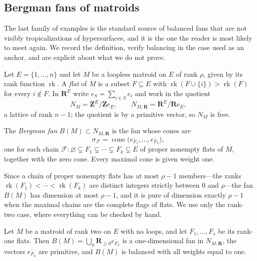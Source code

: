 \subsection{Bergman fans of matroids}
\label{sec:ch10-bergman}

The last family of examples is the standard source of balanced fans that are
not visibly tropicalizations of hypersurfaces, and it is the one the reader
is most likely to meet again.  We record the definition, verify balancing in
the case used as an anchor, and are explicit about what we do not prove.

Let $E=\{1,\ldots,n\}$ and let $M$ be a loopless matroid on $E$ of rank $\rho$, given
by its rank function $\operatorname{rk}$.  A \emph{flat} of $M$ is a subset
$F\subseteq E$ with $\operatorname{rk}(F\cup\{i\})>\operatorname{rk}(F)$ for
every $i\notin F$.  In $\mathbf R^E$ write $e_S=\sum_{i\in S}e_i$ and work in
the quotient
\[
 N_M=\mathbf Z^E/\mathbf Ze_E,
 \qquad
 N_{M,\mathbf R}=\mathbf R^E/\mathbf Re_E,
\]
a lattice of rank $n-1$; the quotient is by a primitive vector, so $N_M$ is
free.

\begin{definition}
\label{def:ch10-bergman-fan}
The \emph{Bergman fan} $B(M)\subset N_{M,\mathbf R}$ is the fan whose cones
are
\[
 \sigma_{\mathscr F}
 =\operatorname{cone}
   \bigl(\overline{e_{F_1}},\ldots,\overline{e_{F_k}}\bigr),
\]
one for each chain $\mathscr F:\varnothing\subsetneq F_1\subsetneq\cdots
\subsetneq F_k\subsetneq E$ of proper nonempty flats of $M$, together with
the zero cone.  Every maximal cone is given weight one.
\end{definition}

Since a chain of proper nonempty flats has at most $\rho-1$ members---the
ranks $\operatorname{rk}(F_1)<\cdots<\operatorname{rk}(F_k)$ are distinct
integers strictly between $0$ and $\rho$---the fan $B(M)$ has dimension at
most $\rho-1$, and it is pure of dimension exactly $\rho-1$ when the maximal
chains are the complete flags of flats.  We use only the rank-two case,
where everything can be checked by hand.

\begin{proposition}
\label{prop:ch10-bergman-rank-two}
Let $M$ be a matroid of rank two on $E$ with no loops, and let
$F_1,\ldots,F_s$ be its rank-one flats.  Then
$B(M)=\bigcup_{k}\mathbf R_{\geq0}\overline{e_{F_k}}$ is a one-dimensional
fan in $N_{M,\mathbf R}$, the vectors $\overline{e_{F_k}}$ are primitive,
and $B(M)$ is balanced with all weights equal to one.
\end{proposition}

